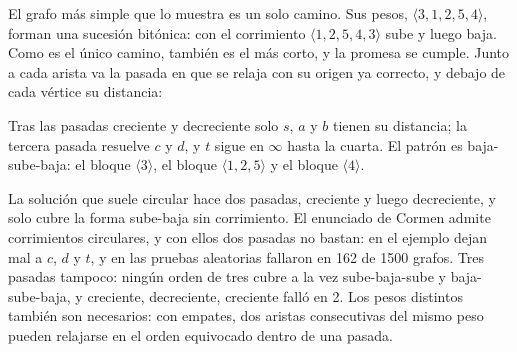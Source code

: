 \documentclass[11pt,letterpaper]{article}
\begin{document}
\begin{ejemplo}
  \label{ej:caminos-bitonicos}
  El grafo más simple que lo muestra es un solo camino. Sus pesos,
  $\langle 3, 1, 2, 5, 4 \rangle$, forman una sucesión bitónica: con
  el corrimiento $\langle 1, 2, 5, 4, 3 \rangle$ sube y luego baja.
  Como es el único camino, también es el más corto, y la promesa se
  cumple. Junto a cada arista va la pasada en que se relaja con su
  origen ya correcto, y debajo de cada vértice su distancia:
  \begin{center}
  \end{center}
  Tras las pasadas creciente y decreciente solo $s$, $a$ y $b$ tienen
  su distancia; la tercera pasada resuelve $c$ y $d$, y $t$ sigue en
  $\infty$ hasta la cuarta. El patrón es baja-sube-baja: el bloque
  $\langle 3 \rangle$, el bloque $\langle 1, 2, 5 \rangle$ y el bloque
  $\langle 4 \rangle$.
\end{ejemplo}

\begin{ojo}
  La solución que suele circular hace dos pasadas, creciente y luego
  decreciente, y solo cubre la forma sube-baja sin corrimiento. El
  enunciado de Cormen admite corrimientos circulares, y con ellos dos
  pasadas no bastan: en el ejemplo dejan mal a $c$, $d$ y $t$, y en
  las pruebas aleatorias fallaron en 162 de 1500 grafos. Tres pasadas
  tampoco: ningún orden de tres cubre a la vez sube-baja-sube y
  baja-sube-baja, y creciente, decreciente, creciente falló en 2. Los
  pesos distintos también son necesarios: con empates, dos aristas
  consecutivas del mismo peso pueden relajarse en el orden equivocado
  dentro de una pasada.
\end{ojo}

\newcommand{\paresCambio}[1]{\textcolor{acento}{\boldsymbol{#1}}}
\newcommand{\paresNulo}{\text{\scriptsize\textsc{nulo}}}
\end{document}
